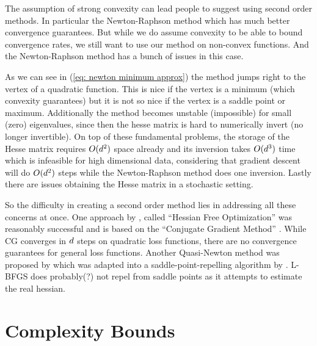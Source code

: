 The assumption of strong convexity can lead people to suggest using second order
methods. In particular the Newton-Raphson method which has much better convergence
guarantees. But while we do assume convexity to be able to bound convergence
rates, we still want to use our method on non-convex functions. And the
Newton-Raphson method has a bunch of issues in this case.

As we can see in (\ref{eq: newton minimum approx}) the method jumps right to the
vertex of a quadratic function. This is nice if the vertex is a minimum
(which convexity guarantees) but it is not so nice if the vertex is a saddle point
or maximum. Additionally the method becomes unstable (impossible) for small 
(zero) eigenvalues, since then the hesse matrix is hard to numerically invert (no
longer invertible).
On top of these fundamental problems, the storage of the Hesse matrix requires
\(O(d^2)\) space already and its inversion takes \(O(d^3)\)
time which is infeasible for high dimensional data, considering that gradient
descent will do \(O(d^2)\) steps while the Newton-Raphson method does
one inversion. Lastly there are issues obtaining the Hesse matrix in a stochastic
setting.

So the difficulty in creating a second order method lies in addressing all these
concerns at once. One approach by \textcite{martensDeepLearningHessianfree2010},
called ``Hessian Free Optimization'' was reasonably successful and is based on
the ``Conjugate Gradient Method'' \parencite[for an introduction see
e.g.][]{shewchukIntroductionConjugateGradient1994}.
While CG converges in \(d\) steps on quadratic loss functions, there
are no convergence guarantees for general loss functions. Another Quasi-Newton
method was proposed by \textcite{vinyalsKrylovSubspaceDescent2012} which was
adapted into a saddle-point-repelling algorithm by
\textcite{dauphinIdentifyingAttackingSaddle2014}. L-BFGS
\parencite[e.g.][]{haghighiNumericalOptimizationUnderstanding2014} does probably(?)
not repel from saddle points as it attempts to estimate the real hessian.






\section{Complexity Bounds}\label{sec: complexity bounds}

